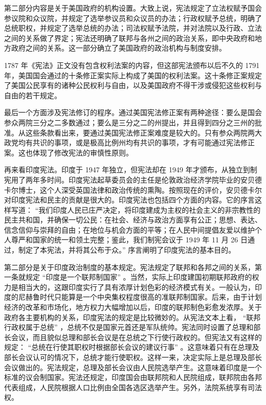 第二部分内容是关于美国政府的机构设置。大致上说，宪法规定了立法权赋予国会参议院和众议院，并规定了选举参议员和众议员的办法；行政权赋予总统，明确了总统职权，并规定了选举总统的办法；司法权赋予法院，并对法院以及行政、立法之间的关系做了界定；宪法还明确了联邦与各州之间的政治关系，即中央政府和地方政府之间的关系。这一部分确立了美国政府的政治机构与制度安排。

1787 年《宪法》正文没有包含权利法案的内容，但这部宪法颁布以后不久的 1791 年，美国国会通过的十条修正案实际上构成了美国的权利法案。这十条修正案规定了美国公民享有的诸种公民权利与自由，以及美国政府不得干涉或侵犯这些权利与自由的若干规定。

最后一个方面涉及宪法修订的程序。通过美国宪法修正案有两种途径：要么是国会参众两院三分之二多数通过；要么是三分之二的州提出，并且得到四分之三州的批准。从这些条款看出来，要通过美国宪法修正案难度是较大的。只有参众两院两大政党均有共识的事项，或是极高比例州均有共识的事项，才有可能通过宪法修正案。这也体现了修改宪法的审慎性原则。

再来看印度宪法。印度于 1947 年独立，但宪法却在 1949 年才颁布，从独立到制宪用了两年多时间。印度宪法起草委员会的主任是伦敦政治经济学院毕业的安贝德卡尔博士，这个人深受英国法律和政治传统的熏陶。按照现在的评价，安贝德卡尔对印度宪法和民主的贡献是很大的。印度宪法也包括四个方面的内容。它的序言这样写道： “我们印度人民已庄严决定，将印度建成为主权的社会主义的非宗教性的民主共和国，并确保一切公民：在社会、经济与政治方面享有公正；思想、表达、信念信仰与崇拜的自由；在地位与机会方面的平等；在人民中间提倡友爱以维护个人尊严和国家的统一和领土完整；鉴此，我们制宪会议于 1949 年 11 月 26 日通过，制定了本宪法，并将其公布于众。” 序言阐明了印度宪法的基本目的。

第二部分是关于印度政治制度的基本规定。宪法规定了联邦和各邦之间的关系，第一条就规定 “印度是一个联邦制国家” 。当然，实际上印度建国初期联邦政府的权力是相当大的，这跟印度实行了具有浓厚计划色彩的经济模式有关。一般认为，印度的尼赫鲁时代只能算是一个中央集权程度很高的准联邦制国家。后来，由于计划经济的改革和市场化，地方权力大幅增加以后，印度的联邦制色彩愈发浓厚。关于政府各主要机构的关系，印度宪法的规定是比较微妙的。从宪法文本上看， “联邦行政权属于总统” ，总统不仅是国家元首还是军队统帅。宪法同时设置了总理和部长会议，而且貌似总理和部长会议是在总统之下行使行政权的。但宪法又有这样的规定： “总统在行使其职权时根据部长会议的建议行事” 。这意味着只有在总理及部长会议认可的情况下，总统才能行使职权。这样一来，决定实际上是总理及部长会议做出的。宪法规定，总理及部长会议由人民院选举产生。这意味着印度是一个标准的议会制国家。宪法还规定，印度国会由联邦院和人民院组成，联邦院由各邦代表组成，人民院根据人口比例由全国各选区选举产生。另外，法院系统享有司法权。

